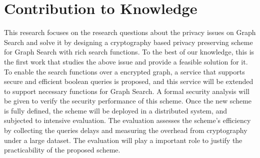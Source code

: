 \chapter{Contribution to Knowledge}
This research focuses on the research questions about the privacy issues on Graph Search and solve it by designing a cryptography based privacy preserving scheme for Graph Search with rich search functions. To the best of our knowledge, this is the first work that studies the above issue and provide a feasible solution for it. To enable the search functions over a encrypted graph, a service that supports secure and efficient boolean queries is proposed, and this service will be extended to support necessary functions for Graph Search. A formal security analysis will be given to verify the security performance of this scheme. Once the new scheme is fully defined, the scheme will be deployed in a distributed system, and subjected to intensive evaluation. The evaluation assesses the scheme's efficiency by collecting the queries delays and measuring the overhead from cryptography under a large dataset. The evaluation will play a important role to justify the practicability of the proposed scheme.
